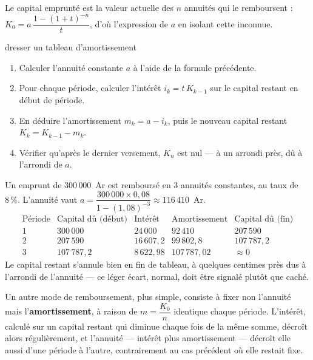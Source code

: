 \begin{demonstration}
Le capital emprunté est la valeur actuelle des $n$ annuités qui le
remboursent : $K_{0} = a\,\dfrac{1-(1+t)^{-n}}{t}$, d'où l'expression de
$a$ en isolant cette inconnue.
\end{demonstration}

\begin{methode}{dresser un tableau d'amortissement}
\begin{enumerate}[label=\textbf{\arabic*.}, leftmargin=*, itemsep=0.15em]
  \item Calculer l'annuité constante $a$ à l'aide de la formule précédente.
  \item Pour chaque période, calculer l'intérêt $i_{k} = t\,K_{k-1}$ sur le
        capital restant en début de période.
  \item En déduire l'amortissement $m_{k} = a-i_{k}$, puis le nouveau
        capital restant $K_{k} = K_{k-1}-m_{k}$.
  \item Vérifier qu'après le dernier versement, $K_{n}$ est nul — à un
        arrondi près, dû à l'arrondi de $a$.
\end{enumerate}
\end{methode}

\begin{exemple}
Un emprunt de $300\,000$~Ar est remboursé en $3$ annuités constantes, au
taux de $8\,\%$. L'annuité vaut
$a = \dfrac{300\,000 \times 0{,}08}{1-(1{,}08)^{-3}} \approx 116\,410$~Ar.
\[
  \begin{array}{c|cccc}
    \text{Période} & \text{Capital dû (début)} & \text{Intérêt} &
    \text{Amortissement} & \text{Capital dû (fin)} \\
    \hline
    1 & 300\,000 & 24\,000 & 92\,410 & 207\,590 \\
    2 & 207\,590 & 16\,607{,}2 & 99\,802{,}8 & 107\,787{,}2 \\
    3 & 107\,787{,}2 & 8\,622{,}98 & 107\,787{,}02 & \approx 0
  \end{array}
\]
Le capital restant s'annule bien en fin de tableau, à quelques centimes près
dus à l'arrondi de l'annuité — ce léger écart, normal, doit être signalé
plutôt que caché.
\end{exemple}

\begin{remarque}
Un autre mode de remboursement, plus simple, consiste à fixer non
l'annuité mais l'\textbf{amortissement}, à raison de $m = \dfrac{K_{0}}{n}$
identique chaque période. L'intérêt, calculé sur un capital restant qui
diminue chaque fois de la même somme, décroît alors régulièrement, et
l'annuité — intérêt plus amortissement — décroît elle aussi d'une période à
l'autre, contrairement au cas précédent où elle restait fixe.
\end{remarque}

